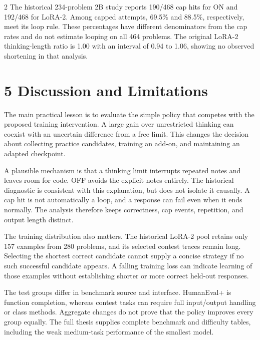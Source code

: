 \documentclass[11pt,letterpaper]{article}
\begin{document}
\begin{multicols}{2}
The historical 234-problem 2B study reports 190/468 cap hits for ON and 192/468 for LoRA-2. Among capped attempts, 69.5\% and 88.5\%, respectively, meet its loop rule. These percentages have different denominators from the cap rates and do not estimate looping on all 464 problems. The original LoRA-2 thinking-length ratio is 1.00 with an interval of 0.94 to 1.06, showing no observed shortening in that analysis.\par

\section*{5 Discussion and Limitations}

The main practical lesson is to evaluate the simple policy that competes with the proposed training intervention. A large gain over unrestricted thinking can coexist with an uncertain difference from a free limit. This changes the decision about collecting practice candidates, training an add-on, and maintaining an adapted checkpoint.\par

A plausible mechanism is that a thinking limit interrupts repeated notes and leaves room for code. OFF avoids the explicit notes entirely. The historical diagnostic is consistent with this explanation, but does not isolate it causally. A cap hit is not automatically a loop, and a response can fail even when it ends normally. The analysis therefore keeps correctness, cap events, repetition, and output length distinct.\par

The training distribution also matters. The historical LoRA-2 pool retains only 157 examples from 280 problems, and its selected contest traces remain long. Selecting the shortest correct candidate cannot supply a concise strategy if no such successful candidate appears. A falling training loss can indicate learning of those examples without establishing shorter or more correct held-out responses.\par

The test groups differ in benchmark source and interface. HumanEval+ is function completion, whereas contest tasks can require full input/output handling or class methods. Aggregate changes do not prove that the policy improves every group equally. The full thesis supplies complete benchmark and difficulty tables, including the weak medium-task performance of the smallest model.\par


\end{multicols}
\end{document}
